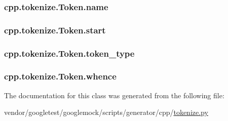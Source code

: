 \subsubsection[{\texorpdfstring{name}{name}}]{\setlength{\rightskip}{0pt plus 5cm}cpp.\+tokenize.\+Token.\+name}\hypertarget{classcpp_1_1tokenize_1_1Token_a90859dd16bde71bc38f717f5119e63b9}{}\label{classcpp_1_1tokenize_1_1Token_a90859dd16bde71bc38f717f5119e63b9}
\subsubsection[{\texorpdfstring{start}{start}}]{\setlength{\rightskip}{0pt plus 5cm}cpp.\+tokenize.\+Token.\+start}\hypertarget{classcpp_1_1tokenize_1_1Token_a8ec48e348ff29901857cb21553da464b}{}\label{classcpp_1_1tokenize_1_1Token_a8ec48e348ff29901857cb21553da464b}
\subsubsection[{\texorpdfstring{token\+\_\+type}{token_type}}]{\setlength{\rightskip}{0pt plus 5cm}cpp.\+tokenize.\+Token.\+token\+\_\+type}\hypertarget{classcpp_1_1tokenize_1_1Token_a60c6e5120f3947885f10788ceb69a660}{}\label{classcpp_1_1tokenize_1_1Token_a60c6e5120f3947885f10788ceb69a660}
\subsubsection[{\texorpdfstring{whence}{whence}}]{\setlength{\rightskip}{0pt plus 5cm}cpp.\+tokenize.\+Token.\+whence}\hypertarget{classcpp_1_1tokenize_1_1Token_a9d3a8011707ede6be85987d74f88848d}{}\label{classcpp_1_1tokenize_1_1Token_a9d3a8011707ede6be85987d74f88848d}


The documentation for this class was generated from the following file\+:\begin{DoxyCompactItemize}
\item 
vendor/googletest/googlemock/scripts/generator/cpp/\hyperlink{tokenize_8py}{tokenize.\+py}\end{DoxyCompactItemize}
